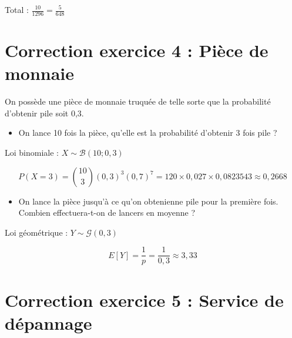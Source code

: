 Total : \(\frac{10}{1296} = \frac{5}{648}\)

\section*{Correction exercice 4 : Pièce de monnaie}

On possède une pièce de monnaie truquée de telle sorte que la probabilité d'obtenir pile soit 0,3.

\begin{itemize}
    \item On lance 10 fois la pièce, qu'elle est la probabilité d'obtenir 3 fois pile ?
\end{itemize}

Loi binomiale : \(X \sim \mathcal{B}(10; 0,3)\)

\[P(X=3) = \binom{10}{3} (0,3)^3 (0,7)^7 = 120 \times 0,027 \times 0,0823543 \approx 0,2668\]

\begin{itemize}
    \item On lance la pièce jusqu'à ce qu'on obtenienne pile pour la première fois. Combien effectuera-t-on de lancers en moyenne ?
\end{itemize}

Loi géométrique : \(Y \sim \mathcal{G}(0,3)\)

\[E[Y] = \frac{1}{p} = \frac{1}{0,3} \approx 3,33\]

\section*{Correction exercice 5 : Service de dépannage}

